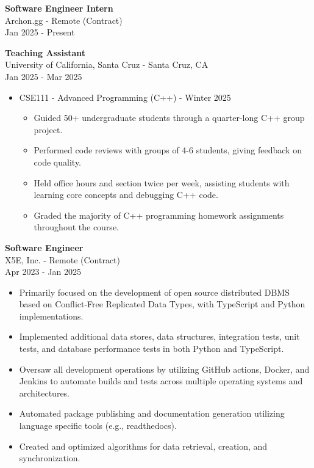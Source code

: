 \documentclass[a4paper,10pt]{article}
\begin{document}
\begin{flushleft}
  \textbf{Software Engineer Intern} \\
  Archon.gg - Remote (Contract) \\
  Jan 2025 - Present
\end{flushleft}

\begin{flushleft}
  \textbf{Teaching Assistant} \\
  University of California, Santa Cruz - Santa Cruz, CA \\
  Jan 2025 - Mar 2025
  \begin{itemize}
    \item CSE111 - Advanced Programming (C++) - Winter 2025
      \begin{itemize}
        \item Guided 50+ undergraduate students through a quarter-long C++ group project.
        \item Performed code reviews with groups of 4-6 students, giving feedback on code quality.
        \item Held office hours and section twice per week, assisting students with learning core concepts and debugging C++ code.
        \item Graded the majority of C++ programming homework assignments throughout the course.
      \end{itemize}
  \end{itemize}
\end{flushleft}

\begin{flushleft}
  \textbf{Software Engineer} \\
  X5E, Inc. - Remote (Contract) \\
  Apr 2023 - Jan 2025
  \begin{itemize}
    \item Primarily focused on the development of open source distributed DBMS based on Conflict-Free Replicated Data Types, with TypeScript and Python implementations.
    \item Implemented additional data stores, data structures, integration tests, unit tests, and database performance tests in both Python and TypeScript.
    \item Oversaw all development operations by utilizing GitHub actions, Docker, and Jenkins to automate builds and tests across multiple operating systems and architectures.
    \item Automated package publishing and documentation generation utilizing language specific tools (e.g., readthedocs).
    \item Created and optimized algorithms for data retrieval, creation, and synchronization.
  \end{itemize}
\end{flushleft}
\end{document}
